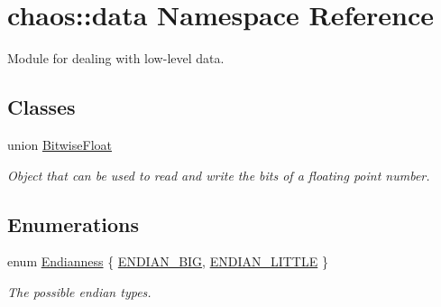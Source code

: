 \hypertarget{namespacechaos_1_1data}{}\section{chaos\+:\+:data Namespace Reference}
\label{namespacechaos_1_1data}


Module for dealing with low-\/level data.  


\subsection*{Classes}
\begin{DoxyCompactItemize}
\item 
union \hyperlink{unionchaos_1_1data_1_1_bitwise_float}{Bitwise\+Float}
\begin{DoxyCompactList}\small\item\em Object that can be used to read and write the bits of a floating point number. \end{DoxyCompactList}\end{DoxyCompactItemize}
\subsection*{Enumerations}
\begin{DoxyCompactItemize}
\item 
enum \hyperlink{namespacechaos_1_1data_adb2657d50c0b84cdc1153001031bbf3f}{Endianness} \{ \hyperlink{namespacechaos_1_1data_adb2657d50c0b84cdc1153001031bbf3fa0e1ed99b965cedefe24534be309738ad}{E\+N\+D\+I\+A\+N\+\_\+\+B\+I\+G}, 
\hyperlink{namespacechaos_1_1data_adb2657d50c0b84cdc1153001031bbf3fa7fc5455bb6147c278dfa4a84e255c66d}{E\+N\+D\+I\+A\+N\+\_\+\+L\+I\+T\+T\+L\+E}
 \}\begin{DoxyCompactList}\small\item\em The possible endian types. \end{DoxyCompactList}
\end{DoxyCompactItemize}
